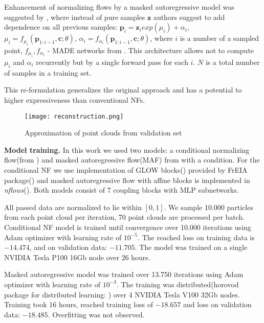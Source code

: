 \documentclass{article}
\begin{document}
Enhancement of normalizing flows by a masked autoregressive model was suggested by \citet{maf}, where instead of pure samples $\bm{z}$ authors suggest to add dependence on all previous samples:
$\bm{p}_i = \bm{z}_i exp(\mu_i)+\alpha_i$, $\mu_i=f_{\mu_i}(\bm{p}_{1:i-1}, \bm{c};\theta)$, $\alpha_i=f_{\alpha_i}(\bm{p}_{1:i-1}, \bm{c};\theta)$,
where $i$ is a number of a sampled point, 
${f_{\mu_i}, f_{\alpha_i}}$ - MADE networks from \citet{made}.
This architecture allows not to compute $\mu_i$ and $\alpha_i$ recurrently but by a single forward pass for each $i$. $N$ is a total number of samples in a training set.

This re-formulation generalizes the original approach and has a potential to higher expressiveness than conventional NFs.

\begin{wrapfigure}[16]{l}{6.5cm}
    \begin{center}
    \vspace*{-8mm}
    \texttt{[image: reconstruction.png]}
    \caption{Approximation of point clouds from validation set}
    \label{fig:3d}
    \end{center}
\end{wrapfigure}

\textbf{Model training.} In this work we used two models: a conditional normalizing flow(from \citet{cinn}) and masked autoregressive flow(MAF) from \citet{maf} with a condition. For the conditional NF we use implementation of GLOW blocks(\citet{glow}) provided by FrEIA package(\citet{freia}) and masked autoregressive flow with affine blocks is implemented in \textit{nflows}(\citet{nflows}). Both models consist of 7 coupling blocks with MLP subnetworks.

All passed data are normalized to lie within $[0, 1]$. 
We sample 10.000 particles from each point cloud per iteration, 70 point clouds are processed per batch.
Conditional NF model is trained until convergence over 10.000 iterations using Adam optimizer with learning rate of $10^{-5}$. 
The reached loss on training data is $-14.474$, and on validation data: $-11.705$. The model was trained on a single NVIDIA Tesla P100 16Gb node over 26 hours. 

Masked autoregressive model was trained over 13.750 iterations using Adam optimizer with learning rate of $10^{-3}$. 
The training was distributed(horovod package for distributed learning: \citet{horovod}) over 4 NVIDIA Tesla V100 32Gb nodes. 
Training took 16 hours, reached training loss of $-18.657$ and loss on validation data: $-18.485$. 
Overfitting was not observed.
\end{document}
